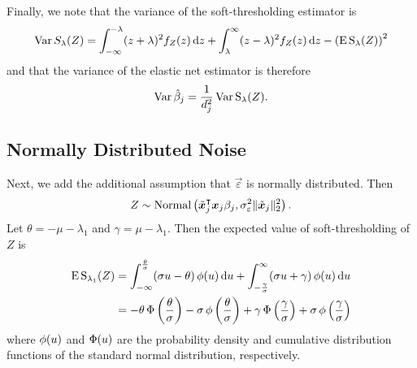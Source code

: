 Finally, we note that the variance of the soft-thresholding estimator is
\begin{equation}
  \label{eq:st-variance}
  \operatorname{Var} {S_\lambda(Z)} = \int_{-\infty}^{-\lambda}(z + \lambda)^2f_Z(z) \mathop{}\!\mathrm{d} z + \int_{\lambda}^\infty (z - \lambda)^2 f_Z(z) \mathop{}\!\mathrm{d} z - \left(\operatorname{E} \operatorname{S}_\lambda(Z)\right)^2
\end{equation}
and that the variance of the elastic net estimator is therefore
\begin{equation}
  \label{eq:betahat-variance}
  \operatorname{Var} \hat\beta_j = \frac{1}{d_j^2} \operatorname{Var} \operatorname{S}_\lambda(Z).
\end{equation}

\subsection{Normally Distributed Noise}

Next, we add the additional assumption that \(\vec{\varepsilon}\) is normally distributed. Then
\[
  Z \sim \operatorname{Normal}\left(\tilde{\boldsymbol{x}}_j^\intercal\boldsymbol{x}_j \beta_j, \sigma_\varepsilon^2 \lVert \tilde{\boldsymbol{x}}_j\rVert_2^2 \right).
\]
Let \(\theta = -\mu -\lambda_1 \) and \(\gamma = \mu - \lambda_1\). Then the expected value of soft-thresholding of \(Z\) is
\begin{align}
  \operatorname{E} \operatorname{S}_{\lambda_1}(Z) & = \int_{-\infty}^\frac{\theta}{\sigma} (\sigma u - \theta) \operatorname{\phi}(u) \mathop{}\!\mathrm{d} u + \int_{-\frac{\gamma}{\sigma}}^\infty (\sigma u + \gamma) \operatorname{\phi}(u) \mathop{}\!\mathrm{d} u                                               \nonumber                      \\
                        & = -\theta \operatorname{\Phi}\left(\frac{\theta}{\sigma}\right) - \sigma \operatorname{\phi}\left(\frac{\theta}{\sigma}\right) + \gamma \operatorname{\Phi}\left(\frac{\gamma}{\sigma}\right) + \sigma \operatorname{\phi}\left(\frac{\gamma}{\sigma}\right) \label{eq:mean-centered-eval}
\end{align}
where \(\operatorname{\phi}(u)\) and \(\operatorname{\Phi}(u)\) are the probability density and cumulative distribution functions of the standard normal distribution, respectively.

